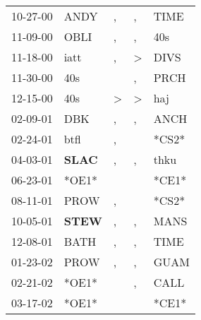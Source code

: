 \begin{supertabular}{p{0.07\textwidth}p{0.06\textwidth}p{0.02\textwidth}p{0.02\textwidth}p{0.06\textwidth}}
 10-27-00\textsuperscript{} &           ANDY\textsuperscript{} &             , &             , &  TIME\textsuperscript{} \\
 11-09-00\textsuperscript{} &           OBLI\textsuperscript{} &             , &             , &   40s\textsuperscript{} \\
 11-18-00\textsuperscript{} &           iatt\textsuperscript{} &             , &  \textgreater &  DIVS\textsuperscript{} \\
 11-30-00\textsuperscript{} &            40s\textsuperscript{} &               &             , &  PRCH\textsuperscript{} \\
 12-15-00\textsuperscript{} &            40s\textsuperscript{} &  \textgreater &  \textgreater &   haj\textsuperscript{} \\
 02-09-01\textsuperscript{} &            DBK\textsuperscript{} &             , &             , &  ANCH\textsuperscript{} \\
 02-24-01\textsuperscript{} &           btfl\textsuperscript{} &             , &               &                   *CS2* \\
 04-03-01\textsuperscript{} &  \textbf{SLAC\textsuperscript{}} &             , &             , &  thku\textsuperscript{} \\
 06-23-01\textsuperscript{} &                            *OE1* &               &               &                   *CE1* \\
 08-11-01\textsuperscript{} &           PROW\textsuperscript{} &             , &               &                   *CS2* \\
 10-05-01\textsuperscript{} &  \textbf{STEW\textsuperscript{}} &             , &             , &  MANS\textsuperscript{} \\
 12-08-01\textsuperscript{} &           BATH\textsuperscript{} &             , &             , &  TIME\textsuperscript{} \\
 01-23-02\textsuperscript{} &           PROW\textsuperscript{} &             , &             , &  GUAM\textsuperscript{} \\
 02-21-02\textsuperscript{} &                            *OE1* &               &             , &  CALL\textsuperscript{} \\
 03-17-02\textsuperscript{} &                            *OE1* &               &               &                   *CE1* \\

\end{supertabular}
